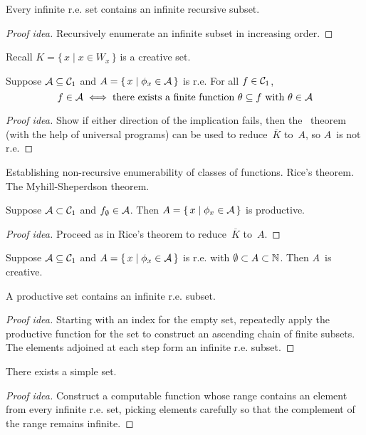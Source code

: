 \begin{cor}
Every infinite r.e. set contains an infinite recursive subset.
\end{cor}
\begin{proof}[Proof idea]
Recursively enumerate an infinite subset in increasing order.
\end{proof}

\noindent Recall \(K=\{\,x\mid x\in W_x\,\}\) is a creative set.

\begin{thm}
Suppose \(\mathcal{A}\subseteq\mathcal{C}_1\) and \(A=\{\,x\mid\phi_x\in\mathcal{A}\,\}\) is r.e. For all \(f\in\mathcal{C}_1\),
\[f\in\mathcal{A}\iff\text{there exists a finite function }\theta\subseteq f\text{ with }\theta\in\mathcal{A}\]
\end{thm}
\begin{proof}[Proof idea]
Show if either direction of the implication fails, then the \smn\ theorem (with the help of universal programs) can be used to reduce~\(\overline{K}\) to~\(A\), so \(A\)~is not r.e.
\end{proof}
\begin{app}
Establishing non-recursive enumerability of classes of functions. Rice's theorem. The Myhill-Sheperdson theorem.
\end{app}

\begin{thm}
Suppose \(\mathcal{A}\subset\mathcal{C}_1\) and \(f_{\emptyset}\in\mathcal{A}\). Then \(A=\{\,x\mid\phi_x\in\mathcal{A}\,\}\) is productive.
\end{thm}
\begin{proof}[Proof idea]
Proceed as in Rice's theorem to reduce~\(\overline{K}\) to~\(A\).
\end{proof}

\begin{cor}
Suppose \(\mathcal{A}\subseteq\mathcal{C}_1\) and \(A=\{\,x\mid\phi_x\in\mathcal{A}\,\}\) is r.e. with \(\emptyset\subset A\subset\mathbb{N}\). Then \(A\)~is creative.
\end{cor}

\begin{thm}
A productive set contains an infinite r.e. subset.
\end{thm}
\begin{proof}[Proof idea]
Starting with an index for the empty set, repeatedly apply the productive function for the set to construct an ascending chain of finite subsets. The elements adjoined at each step form an infinite r.e. subset.
\end{proof}

\begin{thm}[Post]
There exists a simple set.
\end{thm}
\begin{proof}[Proof idea]
Construct a computable function whose range contains an element from every infinite r.e. set, picking elements carefully so that the complement of the range remains infinite.
\end{proof}
